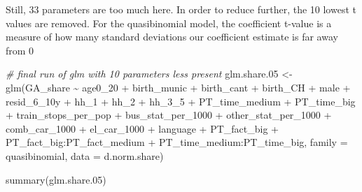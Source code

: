 \documentclass[
]{article}
\newenvironment{Shaded}{\begin{snugshade}}{\end{snugshade}}
\newcommand{\AttributeTok}[1]{\textcolor[rgb]{0.77,0.63,0.00}{#1}}
\newcommand{\CommentTok}[1]{\textcolor[rgb]{0.56,0.35,0.01}{\textit{#1}}}
\newcommand{\FloatTok}[1]{\textcolor[rgb]{0.00,0.00,0.81}{#1}}
\newcommand{\FunctionTok}[1]{\textcolor[rgb]{0.00,0.00,0.00}{#1}}
\newcommand{\NormalTok}[1]{#1}
\newcommand{\OtherTok}[1]{\textcolor[rgb]{0.56,0.35,0.01}{#1}}
\newcommand{\SpecialCharTok}[1]{\textcolor[rgb]{0.00,0.00,0.00}{#1}}
\begin{document}
Still, 33 parameters are too much here. In order to reduce further, the
10 lowest t values are removed. For the quasibinomial model, the
coefficient t-value is a measure of how many standard deviations our
coefficient estimate is far away from 0

\begin{Shaded}
\begin{Highlighting}[]
\CommentTok{\# final run of glm with 10 parameters less present}
\NormalTok{glm.share}\FloatTok{.05} \OtherTok{\textless{}{-}} \FunctionTok{glm}\NormalTok{(GA\_share }\SpecialCharTok{\textasciitilde{}}\NormalTok{  age0\_20 }\SpecialCharTok{+}\NormalTok{ birth\_munic }\SpecialCharTok{+}\NormalTok{ birth\_cant }\SpecialCharTok{+}\NormalTok{ birth\_CH }\SpecialCharTok{+}\NormalTok{ male }\SpecialCharTok{+} 
\NormalTok{    resid\_6\_10y }\SpecialCharTok{+}\NormalTok{ hh\_1 }\SpecialCharTok{+}\NormalTok{ hh\_2 }\SpecialCharTok{+}\NormalTok{ hh\_3\_5 }\SpecialCharTok{+}\NormalTok{ PT\_time\_medium }\SpecialCharTok{+}\NormalTok{ PT\_time\_big }\SpecialCharTok{+} 
\NormalTok{    train\_stops\_per\_pop }\SpecialCharTok{+}\NormalTok{ bus\_stat\_per\_1000 }\SpecialCharTok{+}\NormalTok{ other\_stat\_per\_1000 }\SpecialCharTok{+}\NormalTok{ comb\_car\_1000 }\SpecialCharTok{+} 
\NormalTok{    el\_car\_1000 }\SpecialCharTok{+}\NormalTok{ language }\SpecialCharTok{+}\NormalTok{ PT\_fact\_big }\SpecialCharTok{+}\NormalTok{ PT\_fact\_big}\SpecialCharTok{:}\NormalTok{PT\_fact\_medium }\SpecialCharTok{+} 
\NormalTok{    PT\_time\_medium}\SpecialCharTok{:}\NormalTok{PT\_time\_big, }\AttributeTok{family =}\NormalTok{ quasibinomial, }\AttributeTok{data =}\NormalTok{ d.norm.share)}

\FunctionTok{summary}\NormalTok{(glm.share}\FloatTok{.05}\NormalTok{)}
\end{Highlighting}
\end{Shaded}
\end{document}
